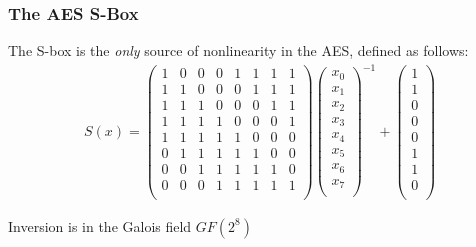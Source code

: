 \documentclass[handout,10pt]{beamer}
\begin{document}
\begin{frame}
	\frametitle{The AES S-Box}
	The S-box is the \emph{only} source of nonlinearity in the AES, defined as follows:
\begin{align*}
S(x) =  
\begin{pmatrix}
1 & 0 & 0 & 0 & 1 & 1 & 1 & 1 \\
1 & 1 & 0 & 0 & 0 & 1 & 1 & 1 \\
1 & 1 & 1 & 0 & 0 & 0 & 1 & 1 \\
1 & 1 & 1 & 1 & 0 & 0 & 0 & 1 \\
1 & 1 & 1 & 1 & 1 & 0 & 0 & 0 \\
0 & 1 & 1 & 1 & 1 & 1 & 0 & 0 \\
0 & 0 & 1 & 1 & 1 & 1 & 1 & 0 \\
0 & 0 & 0 & 1 & 1 & 1 & 1 & 1 \\
\end{pmatrix}
\begin{pmatrix}
x_0 \\
x_1 \\
x_2 \\
x_3 \\
x_4 \\ 
x_5 \\
x_6 \\
x_7 \\
\end{pmatrix}^{-1}
+
\begin{pmatrix}
1 \\
1 \\
0 \\
0 \\
0 \\ 
1 \\
1 \\
0 \\
\end{pmatrix}
\end{align*}

	\medskip

	\begin{center}
	Inversion is in the Galois field $GF(2^8)$
	\end{center}

\end{frame}
\end{document}
